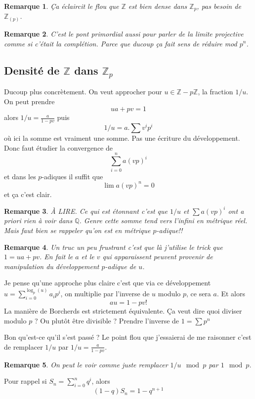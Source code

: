 \documentclass[a4paper,12pt]{book}
\newcommand{\Z}{\mathbb{Z}}
\newcommand{\Q}{\mathbb{Q}}
\theoremstyle{plain}
\newtheorem{rem}{Remarque}
\theoremstyle{definition}
\theoremstyle{remark}
\begin{document}
\begin{rem}
    Ça éclaircit le flou que $\Z$ est bien dense dans
    $\Z_p$, pas besoin de $\Z_{(p)}$.
\end{rem}

\begin{rem}
    C'est le pont primordial aussi pour parler de la limite
    projective comme si c'était la complétion. Parce que
    ducoup ça fait sens de réduire mod $p^n$.
\end{rem}

\subsection{Densité de $\Z$ dans $\Z_p$}
Ducoup plus concrètement. On veut approcher
pour $u\in \Z-p\Z$, la fraction $1/u$. On peut
prendre \[ua+pv=1\]
alors $1/u =\frac{a}{1-pv}$ puis 
\[1/u=a.\sum v^i p^i\]
où ici la somme est vraiment une somme. Pas une
écriture du développement. Donc faut étudier la
convergence de 
\[\sum_{i=0}^n a(vp)^i\]
et dans les $p$-adiques il suffit que 
\[\lim a(vp)^n =0\]
et ça c'est clair.
\begin{rem}
    À LIRE. Ce qui est étonnant c'est que $1/u$ 
    et $\sum a(vp)^i$ ont a priori rien à voir
    dans $\Q$. Genre cette somme tend vers l'infini
    en métrique réel. Mais faut bien se rappeler qu'on
    est en métrique $p$-adique!!
\end{rem}
\begin{rem}
    Un truc un peu frustrant c'est que là j'utilise
    le trick que $1=ua+pv$. En fait le $a$ et
    le $v$ qui apparaissent peuvent provenir
    de manipulation du
    développement $p$-adique de $u$.
\end{rem}
Je pense qu'une approche plus claire c'est que via
ce développement $u=\sum_{i=0}^{\log_p(u)} a_ip^i$,
on multiplie par l'inverse de $u$ modulo $p$, ce sera $a$.
Et alors 
\[au=1-pv!\]
La manière de Borcherds est strictement équivalente.
Ça veut dire quoi diviser modulo $p$ ? Ou plutôt
être divisible ? Prendre l'inverse de $1=\sum p^n$

Bon qu'est-ce qu'il s'est passé ? Le point flou
que j'essaierai de me raisonner c'est de remplacer
$1/u$ par $1/u =\frac{a}{1-pv}$. 

\begin{rem}
    On peut le voir comme juste remplacer $1/u \mod p$ par
    $1 \mod p$.
\end{rem}
Pour rappel si
$S_n=\sum_{i=0}^n q^i$, alors
\[(1-q)S_n=1-q^{n+1}\]
\end{document}
